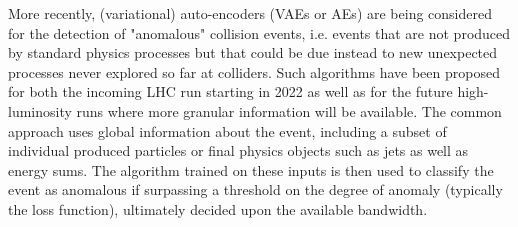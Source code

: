 
More recently, (variational) auto-encoders (VAEs or AEs) are being considered for the detection of "anomalous" collision events, i.e. events that are not produced by standard physics processes but that could be due instead to new unexpected processes never explored so far at colliders. Such algorithms have been proposed for both the incoming LHC run starting in 2022 as well as for the future high-luminosity runs where more granular information will be available. The common approach uses global information about the event, including a subset of individual produced particles or final physics objects such as jets as well as energy sums. The algorithm trained on these inputs is then used to classify the event as anomalous if surpassing a threshold on the degree of anomaly (typically the loss function), ultimately decided upon the available bandwidth.
